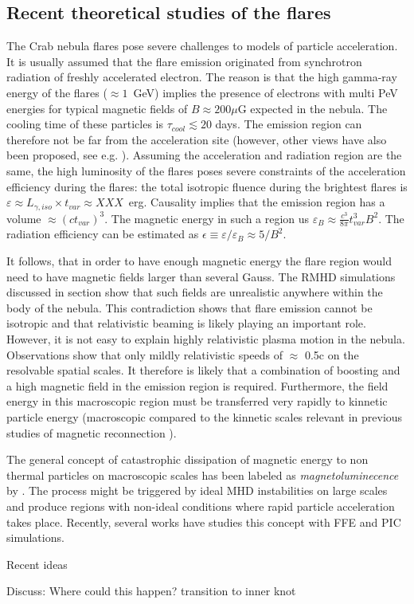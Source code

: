 \subsection{Recent theoretical studies of the flares}

The Crab nebula flares pose severe challenges to models of particle acceleration. It is usually assumed that the flare emission originated from synchrotron radiation of freshly accelerated electron. The reason is that the high gamma-ray energy of the flares ($\approx 1$~GeV) implies the presence of electrons with multi PeV energies for typical magnetic fields of $B \approx 200 \mu$G expected in the nebula. The cooling time of these particles is $\tau_{cool} \lesssim 20$ days. The emission region can therefore not be far from the acceleration site (however, other views have also been proposed, see e.g. \citet{Bykov_2012,2015arXiv151205426Z}). Assuming the acceleration and radiation region are the same, the high luminosity of the flares poses severe constraints of the acceleration efficiency during the flares: the total isotropic fluence during the brightest flares is $\varepsilon \approx L_{\gamma,iso} \times t_{var} \approx XXX $~erg. Causality implies that the emission region has a volume $\approx (c t_{var})^3$. The magnetic energy in such a region us $\varepsilon_B \approx \frac{c^3}{8 \pi} t_{var}^3 B^2$. The radiation efficiency can be estimated as $\epsilon \equiv \varepsilon / \varepsilon_B \approx  5 / B^2$. 

It follows, that in order to have enough magnetic energy the flare region would need to have magnetic fields larger than several Gauss. The RMHD simulations discussed in section show that such fields are unrealistic anywhere within the body of the nebula.  This contradiction shows that flare emission cannot be isotropic and that relativistic beaming is likely playing an important role. However, it is not easy to explain highly relativistic plasma motion in the nebula. Observations show that only mildly relativistic speeds of $\approx$ 0.5c on the resolvable spatial scales. It therefore is likely that a combination of boosting and a high magnetic field in the emission region is required. Furthermore, the field energy in this macroscopic region must be transferred very rapidly to kinnetic particle energy (macroscopic compared to the kinnetic scales relevant in previous studies of magnetic reconnection \citep{Cerutti_2014}). 

The general concept of catastrophic dissipation of magnetic energy to non thermal particles on macroscopic scales has been labeled as \textit{magnetoluminecence} by \cite{Blandford_2014}. The process might be  triggered by ideal MHD instabilities on large scales and produce regions with non-ideal conditions where rapid particle acceleration takes place. Recently, several works have studies this concept with FFE and PIC simulations. 


Recent ideas  \cite{2016arXiv160403179Y}\cite{2016arXiv160304850N}\cite{2016arXiv160305731L}

Discuss: Where could this happen? transition to inner knot
